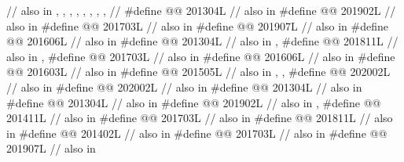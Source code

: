 \begin{codeblock}
  // also in , , , , , , , ,
  // 
#define @@                 201304L // also in 
#define @@                         201902L // also in 
#define @@                        201703L // also in 
#define @@                            201907L // also in 
#define @@                           201606L // also in 
#define @@        201304L // also in , 
#define @@          201811L
  // also in , 
#define @@        201703L // also in 
#define @@ 201606L // also in 
#define @@                             201603L // also in 
#define @@     201505L
  // also in , , 
#define @@                          202002L // also in 
#define @@      202002L // also in 
#define @@                  201304L // also in 
#define @@        201304L // also in 
#define @@                       201902L // also in , 
#define @@                            201411L // also in 
#define @@                      201703L // also in 
#define @@             201811L // also in 
#define @@                          201402L // also in 
#define @@                      201703L // also in 
#define @@              201907L // also in 

\end{codeblock}
